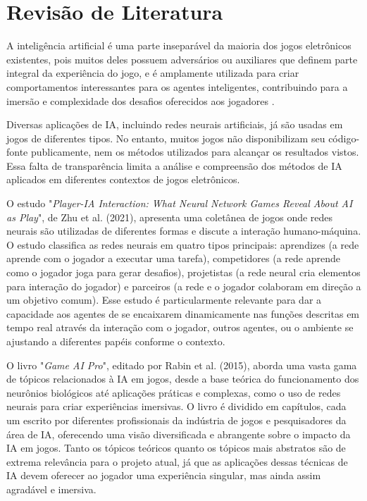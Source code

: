\chapter[Revisão de Literatura]{Revisão de Literatura}\label{capitulo2}

A inteligência artificial é uma parte inseparável da maioria dos jogos eletrônicos existentes, pois muitos deles possuem adversários ou auxiliares que definem parte integral da experiência do jogo, e é amplamente utilizada para criar comportamentos interessantes para os agentes inteligentes, contribuindo para a imersão e complexidade dos desafios oferecidos aos jogadores \cite{dill2015whatis}.

Diversas aplicações de IA, incluindo redes neurais artificiais, já são usadas em jogos de diferentes tipos. No entanto, muitos jogos não disponibilizam seu código-fonte publicamente, nem os métodos utilizados para alcançar os resultados vistos. Essa falta de transparência limita a análise e compreensão dos métodos de IA aplicados em diferentes contextos de jogos eletrônicos.

O estudo "\textit{Player-IA Interaction: What Neural Network Games Reveal About AI as Play}", de Zhu et al. (2021), apresenta uma coletânea de jogos onde redes neurais são utilizadas de diferentes formas e discute a interação humano-máquina. O estudo classifica as redes neurais em quatro tipos principais: aprendizes (a rede aprende com o jogador a executar uma tarefa), competidores (a rede aprende como o jogador joga para gerar desafios), projetistas (a rede neural cria elementos para interação do jogador) e parceiros (a rede e o jogador colaboram em direção a um objetivo comum). Esse estudo é particularmente relevante para dar a capacidade aos agentes de se encaixarem dinamicamente nas funções descritas em tempo real através da interação com o jogador, outros agentes, ou o ambiente se ajustando a diferentes papéis conforme o contexto.

O livro "\textit{Game AI Pro}", editado por Rabin et al. (2015), aborda uma vasta gama de tópicos relacionados à IA em jogos, desde a base teórica do funcionamento dos neurônios biológicos até aplicações práticas e complexas, como o uso de redes neurais para criar experiências imersivas. O livro é dividido em capítulos, cada um escrito por diferentes profissionais da indústria de jogos e pesquisadores da área de IA, oferecendo uma visão diversificada e abrangente sobre o impacto da IA em jogos. Tanto os tópicos teóricos quanto os tópicos mais abstratos são de extrema relevância para o projeto atual, já que as aplicações dessas técnicas de IA devem oferecer ao jogador uma experiência singular, mas ainda assim agradável e imersiva.

